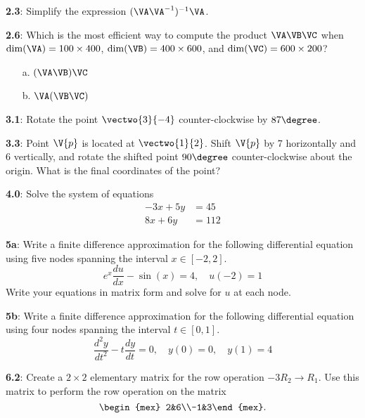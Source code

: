 \documentclass[pal,wide,12pt]{pajarticle}
\newenvironment{problem}[1]{\noindent\textbf{#1}:}{\newpage}
\begin{document}
\begin{problem}{2.3}
Simplify the expression $(\VA\VA^{-1})^{-1}\VA$.	
\end{problem}

\begin{problem}{2.6}
	Which is the most efficient way to compute the product $\VA\VB\VC$ when $\dim(\VA) = 100\times400$, $\dim(\VB) = 400\times600$, and $\dim(\VC) = 600\times200$?
	
	\begin{enumerate}
		\item[a.] $(\VA\VB)\VC$
		\item[b.] $\VA(\VB\VC)$
	\end{enumerate}
\end{problem}

\begin{problem}{3.1}
	Rotate the point $\vectwo{3}{-4}$ counter-clockwise by $87\degree$.
\end{problem}

\begin{problem}{3.3}
	Point $\V{p}$ is located at $\vectwo{1}{2}$. Shift $\V{p}$ by 7 horizontally and 6 vertically, and rotate the shifted point $90\degree$ counter-clockwise about the origin. What is the final coordinates of the point?
\end{problem}

\begin{problem}{4.0}
Solve the system of equations
\begin{align*}
	-3x + 5y &= 45 \\
	8x + 6y &= 112	
\end{align*}
\end{problem}


\begin{problem}{5a}
Write a finite difference approximation for the following differential equation using five nodes spanning the interval $x\in[-2,2]$.
\[ e^x\frac{du}{dx} - \sin(x) = 4, \quad u(-2) = 1 \]
Write your equations in matrix form and solve for $u$ at each node.	
\end{problem}


\begin{problem}{5b}
Write a finite difference approximation for the following differential equation using four nodes spanning the interval $t\in[0,1]$.
\[ \frac{d^2y}{dt^2} - t\frac{dy}{dt} = 0, \quad y(0) = 0,\quad y(1) = 4 \]	
\end{problem}

\begin{problem}{6.2}
	Create a $2\times2$ elementary matrix for the row operation $-3R_2\rightarrow R_1$. Use this matrix to perform the row operation on the matrix
	\[ \begin{mex} 2&6\\-1&3\end{mex}. \]	
\end{problem}
\end{document}
